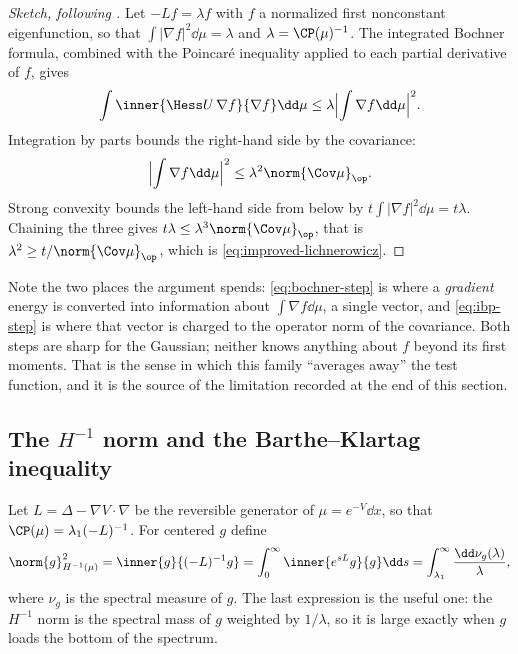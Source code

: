 \documentclass[../../main.tex]{subfiles}
\begin{document}
\begin{proof}[Sketch, following {\cite{Klartag2023Logarithmic}}]
Let $-Lf=\lambda f$ with $f$ a normalized first nonconstant eigenfunction, so that
$\int|\nabla f|^2\dd\mu=\lambda$ and $\lambda=\CP(\mu)^{-1}$. The integrated Bochner formula,
combined with the Poincar\'e inequality applied to each partial derivative of $f$, gives
\begin{equation}
  \int\inner{\Hess U\,\nabla f}{\nabla f}\dd\mu
  \le\lambda\Bigl|\int\nabla f\dd\mu\Bigr|^2 .
  \label{eq:bochner-step}
\end{equation}
Integration by parts bounds the right-hand side by the covariance:
\begin{equation}
  \Bigl|\int\nabla f\dd\mu\Bigr|^2\le\lambda^2\norm{\Cov\mu}_\op .
  \label{eq:ibp-step}
\end{equation}
Strong convexity bounds the left-hand side from below by $t\int|\nabla f|^2\dd\mu=t\lambda$.
Chaining the three gives $t\lambda\le\lambda^3\norm{\Cov\mu}_\op$, that is
$\lambda^2\ge t/\norm{\Cov\mu}_\op$, which is \eqref{eq:improved-lichnerowicz}.
\end{proof}

Note the two places the argument spends: \eqref{eq:bochner-step} is where a \emph{gradient} energy
is converted into information about $\int\nabla f\dd\mu$, a single vector, and
\eqref{eq:ibp-step} is where that vector is charged to the operator norm of the covariance. Both
steps are sharp for the Gaussian; neither knows anything about $f$ beyond its first moments. That
is the sense in which this family ``averages away'' the test function, and it is the source of the
limitation recorded at the end of this section.

\subsection{The \texorpdfstring{$H^{-1}$}{H-1} norm and the Barthe--Klartag inequality}
\label{subsec:hminus1}

Let $L=\Delta-\nabla V\cdot\nabla$ be the reversible generator of $\mu=e^{-V}\dd x$, so that
$\CP(\mu)=\lambda_1(-L)^{-1}$. For centered $g$ define
\begin{equation}
  \norm{g}_{H^{-1}(\mu)}^2
  =\inner{g}{(-L)^{-1}g}
  =\int_0^\infty\inner{e^{sL}g}{g}\dd s
  =\int_{\lambda_1}^\infty\frac{\dd\nu_g(\lambda)}\lambda ,
  \label{eq:hminus1-def}
\end{equation}
where $\nu_g$ is the spectral measure of $g$. The last expression is the useful one: the
$H^{-1}$ norm is the spectral mass of $g$ weighted by $1/\lambda$, so it is large exactly when $g$
loads the bottom of the spectrum.
\end{document}

